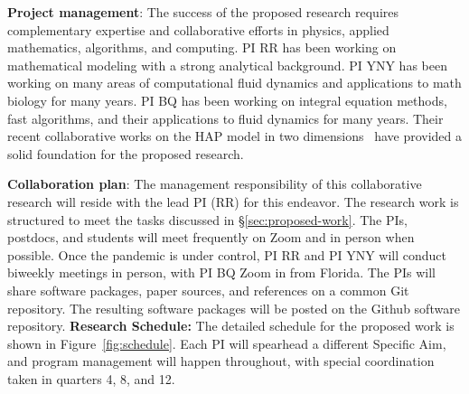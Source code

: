 \textbf{Project management}: 
%
The success of the proposed research requires complementary expertise
and collaborative efforts in physics, applied mathematics, algorithms,
and computing. PI RR has been working on mathematical modeling with a
strong analytical background. PI YNY has been working on many areas of
computational fluid dynamics and applications to math biology for many
years. PI BQ has been working on integral equation methods, fast
algorithms, and their applications to fluid dynamics for many years.
Their recent collaborative works on the HAP model in two
dimensions~\cite{FuQuRyYo22, fu-ryh-qua-you2022} have provided a solid
foundation for the proposed research.

\smallskip

\textbf{Collaboration plan}: 
%
The management responsibility of this collaborative research will reside
with the lead PI (RR) for this endeavor. The research work is structured
to meet the tasks discussed in \S\ref{sec:proposed-work}. The PIs,
postdocs, and students will meet frequently on Zoom and in person when
possible.
Once the pandemic is under control, PI RR and PI
YNY will conduct biweekly meetings in person, with PI BQ Zoom in from
Florida. The PIs will share software packages, paper sources, and
references on a common \textsf{Git} repository. The resulting software
packages will be posted on the \textsf{Github} software repository.
%
%
\textbf{Research Schedule:} The detailed schedule for the proposed work
is shown in Figure~\ref{fig:schedule}. Each PI will spearhead a
different Specific Aim, and program management will happen
throughout, with special coordination taken in quarters 4, 8, and
12.


